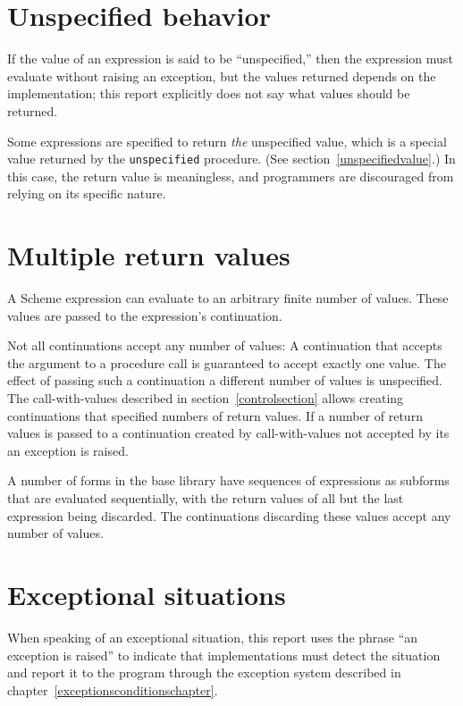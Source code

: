 \section{Unspecified behavior}

\vest If the value of an expression is said to be ``unspecified,''
then the expression must evaluate without raising an exception, but
the values returned depends on the implementation; this report
explicitly does not say what values should be returned.

Some expressions are specified to return \emph{the} unspecified value,
which is a special value returned by the \texttt{unspecified}
procedure.  (See section~\ref{unspecifiedvalue}.)  In this case, the
return value is meaningless, and programmers are discouraged from
relying on its specific nature.

\section{Multiple return values}

A Scheme expression can evaluate to an arbitrary finite number of
values.  These values are passed to the expression's continuation.

Not all continuations accept any number of values: A continuation that
accepts the argument to a procedure call is guaranteed to accept
exactly one value.  The effect of passing such a continuation a
different number of values is unspecified.  The {\cf call-with-values}
described in section~\ref{controlsection} allows creating
continuations that specified numbers of return values.  If a number of
return values is passed to a continuation created by {\cf
  call-with-values} not accepted by its  an exception is
raised.

A number of forms in the base library have sequences of expressions
as subforms that are evaluated sequentially, with the return values of
all but the last expression being discarded.  The continuations
discarding these values accept any number of values.

\section{Exceptional situations}

 When speaking of an exceptional situation, this
report uses the phrase ``an exception is raised'' to indicate
that implementations must detect the situation and report it to the
program through the exception system described in
chapter~\ref{exceptionsconditionschapter}.

